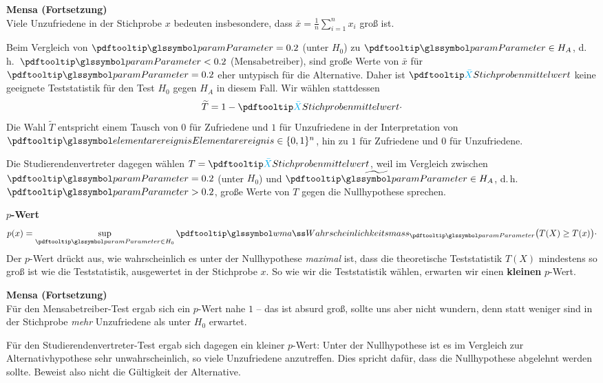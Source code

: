 \begin{bsp}
    \textbf{Mensa (Fortsetzung)}  \\
    Viele Unzufriedene in der Stichprobe $x$ bedeuten insbesondere, dass $\bar x = \frac1n\sum_{i=1}^n x_i$ groß
    ist.

    Beim Vergleich von $\param=0.2$ (unter $H_0$) zu $\param \in H_A$, d.\,h.\ $\param < 0.2$ (Mensabetreiber),
    sind große Werte von $\bar x$ für $\param=0.2$ eher untypisch für die Alternative.
    Daher ist $\spmw$ keine
    geeignete Teststatistik für den Test $H_0$ gegen $H_A$ in diesem Fall.
    Wir wählen stattdessen
    \[
        \widetilde T = 1 - \spmw \cdot
    \]
    Die Wahl $\widetilde T$ entspricht einem Tausch von $0$ für Zufriedene und $1$ für Unzufriedene in der
    Interpretation von $\ele \in \{0,1\}^n$, hin zu $1$ für Zufriedene und $0$ für Unzufriedene.

    Die Studierendenvertreter dagegen wählen $T = \spmw$, weil im Vergleich zwischen $\param=0.2$ (unter $H_0$)
    und $\widetilde\param \in H_A$, d.\,h.\ $\param > 0.2$, große Werte von $T$ gegen die Nullhypothese sprechen.
\end{bsp}

\begin{defi}
    \textbf{$p$-Wert} \label{defi:p-wert}  \\
    \[
        p(x) = \sup_{\param \in H_0} \pe_{\param}\big( T(X) \geq T(x) \big) \cdot
    \]
    Der $p$-Wert drückt aus, wie wahrscheinlich es unter der Nullhypothese \emph{maximal} ist, dass die
    theoretische Teststatistik $T(X)$ mindestens so groß ist wie die Teststatistik, ausgewertet in der Stichprobe
    $x$.
    So wie wir die Teststatistik wählen, erwarten wir einen \textbf{kleinen} $p$-Wert.
\end{defi}

\begin{bsp}
    \textbf{Mensa (Fortsetzung)}  \\
    Für den Mensabetreiber-Test ergab sich ein $p$-Wert nahe $1$ -- das ist absurd groß, sollte uns aber nicht
    wundern, denn statt weniger sind in der Stichprobe \emph{mehr} Unzufriedene als unter $H_0$ erwartet.

    Für den Studierendenvertreter-Test ergab sich dagegen ein kleiner $p$-Wert: Unter der Nullhypothese ist es im
    Vergleich zur Alternativhypothese sehr unwahrscheinlich, so viele Unzufriedene anzutreffen.
    Dies spricht dafür,
    dass die Nullhypothese abgelehnt werden sollte.
    Beweist also nicht die Gültigkeit der Alternative.
\end{bsp}

